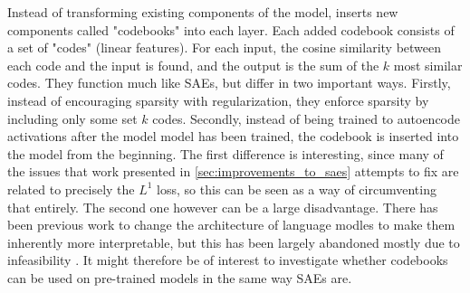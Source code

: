 Instead of transforming existing components of the model, \textcite{tamkin_codebook_2023} inserts new components called "codebooks" into each layer.
Each added codebook consists of a set of "codes" (linear features).
For each input, the cosine similarity between each code and the input is found, and the output is the sum of the $k$ most similar codes. 
They function much like SAEs, but differ in two important ways.
Firstly, instead of encouraging sparsity with regularization, they enforce sparsity by including only some set $k$ codes.
Secondly, instead of being trained to autoencode activations after the model model has been trained, the codebook is inserted into the model from the beginning.
The first difference is interesting, since many of the issues that work presented in \ref{sec:improvements_to_saes} attempts to fix are related to precisely the $L^1$ loss, so this can be seen as a way of circumventing that entirely.
The second one however can be a large disadvantage.
There has been previous work \parencite{elhage_softmax_2022} to change the architecture of language modles to make them inherently more interpretable, but this has been largely abandoned mostly due to infeasibility \parencite{bricken_towards_2023}.
It might therefore be of interest to investigate whether codebooks can be used on pre-trained models in the same way SAEs are.
